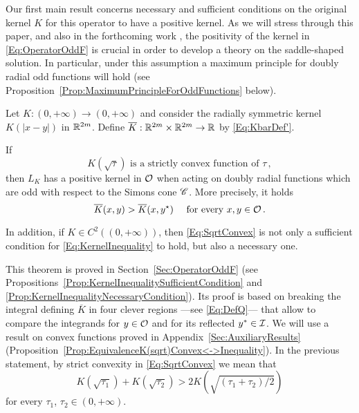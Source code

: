 Our first main result concerns necessary and sufficient conditions on the original kernel $K$ for this operator to have a positive kernel.  As we will stress through this paper, and also in the forthcoming work \cite{FelipeSanz-Perela:IntegroDifferentialII}, the positivity of the kernel in \eqref{Eq:OperatorOddF} is crucial in order to develop a theory on the saddle-shaped solution. In particular, under this assumption a maximum principle for doubly radial odd functions will hold (see Proposition~\ref{Prop:MaximumPrincipleForOddFunctions} below).

\begin{theorem}
	\label{Th:SufficientNecessaryConditions}
	Let $K:(0,+\infty) \to (0,+\infty)$ and consider the radially symmetric kernel $K(|x-y|)$ in $\mathbb{R}^{2m}$. Define $\overline{K} : \mathbb{R}^{2m}\times \mathbb{R}^{2m} \to \mathbb{R}$ by \eqref{Eq:KbarDef'}.
	
	If 
	\begin{equation}
	\label{Eq:SqrtConvex}	
	K(\sqrt{\tau}) \text{ is a strictly convex function of }\tau\,,
	\end{equation}
	then $L_K$ has a positive kernel in $\mathcal{O}$ when acting on doubly radial functions which are odd with respect to the Simons cone $\mathscr{C}$. More precisely, it holds
	\begin{equation}
	\label{Eq:KernelInequality}
	\overline{K}(x,y) > \overline{K}(x, y^\star) \quad \text{ for every }x,y \in \mathcal{O}\,.
	\end{equation}
	
	In addition, if $K\in C^2((0,+\infty))$, then \eqref{Eq:SqrtConvex} is not only a sufficient condition for \eqref{Eq:KernelInequality} to hold, but also a necessary one.
\end{theorem}

This theorem is proved in Section~\ref{Sec:OperatorOddF} (see Propositions~\ref{Prop:KernelInequalitySufficientCondition} and \ref{Prop:KernelInequalityNecessaryCondition}). Its proof is based on breaking the integral defining $\overline{K}$ in four clever regions ---see \eqref{Eq:DefQ}--- that allow to compare the integrands for $y\in \mathcal{O}$ and for its reflected $y^*\in \mathcal{I}$. We will use a result on convex functions proved in Appendix~\ref{Sec:AuxiliaryResults} (Proposition~\ref{Prop:EquivalenceK(sqrt)Convex<->Inequality}). In the previous statement, by strict convexity in \eqref{Eq:SqrtConvex} we mean that
$$
K(\sqrt{\tau_1}) + K(\sqrt{\tau_2}) > 2 K(\sqrt{(\tau_1 + \tau_2)/2})
$$
for every $\tau_1$, $\tau_2 \in (0,+\infty)$.

